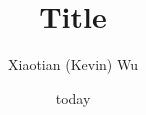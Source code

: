 \documentclass[12pt]{article} %
\title{Title}
\date{today}
\author{Xiaotian (Kevin) Wu}
\newcommand{\beginsupplement}{%
	\setcounter{table}{0}
	\renewcommand{\thetable}{S\arabic{table}}%
	\setcounter{figure}{0}
	\renewcommand{\thefigure}{S\arabic{figure}}%
}
\begin{document}
\maketitle













\iffalse
\beginsupplement
\section*{Supplemental Figures}

\begin{figure}
	\texttt{[image: ]}
	\caption{}
	\label{}
\end{figure}
\fi
\end{document}

